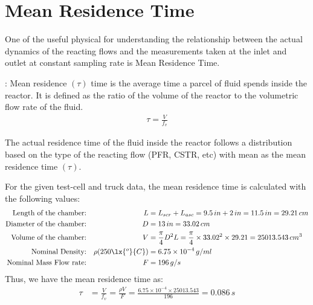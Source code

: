 \section{Mean Residence Time}
One of the useful physical for understanding the relationship between the actual dynamics of the reacting flows and the measurements taken at the inlet and outlet at constant sampling rate is Mean Residence Time.

: Mean residence $(\tau)$ time is the average time a parcel of fluid spends inside the reactor. It is
defined as the ratio of the volume of the reactor to the volumetric flow rate of the fluid.
\begin{align}
    \tau = \frac{V}{f_v}
\end{align}

The actual residence time of the fluid inside the reactor follows a distribution based on the type of the reacting flow
(PFR, CSTR, etc) with mean as the mean residence time $(\tau)$.

For the given test-cell and truck data, the mean residence time is calculated with the following values:
\begin{align*}
    \text{Length of the chamber:}&&
    L &= L_{scr} + L_{asc} = 9.5 \, in  + 2 \, in = 11.5 \, in = 29.21 \, cm\\
    \text{Diameter of the chamber:} &&
    D &= 13 \, in = 33.02 \, cm\\
    \text{Volume of the chamber:} &&
    V &= \frac{\pi}{4} D^2 L = \frac{\pi}{4} \times 33.02^2 \times 29.21 = 25013.543 \, cm^3\\
    \text{Nominal Density:} &&
    \rho(250 \lx{^o}{C}) &= 6.75 \times 10^{-4} \, g/ml\\
    \text{Nominal Mass Flow rate:} &&
    F &= 196 \, g/s
\end{align*}
Thus, we have the mean residence time as:
\begin{align}
    \tau &= \frac{V}{f_v} = \frac{\rho V}{F} = \frac{6.75 \times 10^{-4} \times 25013.543}{196} = 0.086 \, s
\end{align}

